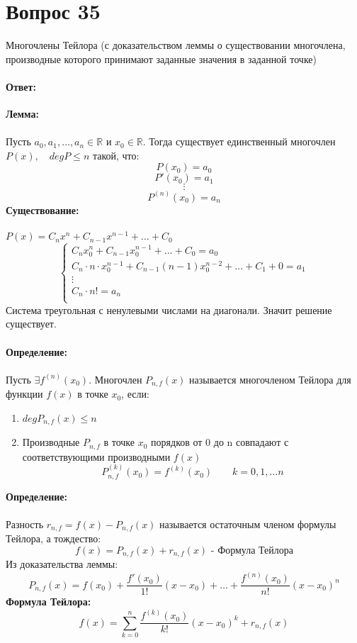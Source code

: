 \documentclass{article}
\DeclareMathOperator{\Exists}{\exists}
\begin{document}
 
\part*{Вопрос 35}
\begin{center}
Многочлены Тейлора (с доказательством леммы о существовании многочлена, производные которого принимают заданные значения в заданной точке)
\end{center}
\subsection*{Ответ:}
\textbf{Лемма:}\\\\
Пусть $a_0, a_1,\ldots,a_n \in \mathbb{R}$ и $x_0\in\mathbb{R}$. Тогда существует единственный многочлен $P(x),\quad deg P\leqslant n$ такой, что:
$$P(x_0)=a_0$$
$$P'(x_0)=a_1$$
$$\vdots$$
$$P^{(n)}(x_0) = a_n$$
\textbf{Существование:}\\\\
$P(x) = C_n x^n+C_{n-1}x^{n-1}+\ldots+C_0$
$$
\begin{cases}
C_n x_0^n+C_{n-1}x_0^{n-1}+\ldots+C_0=a_0\\
C_n\cdot n\cdot x_0^{n-1}+C_{n-1}(n-1)x_0^{n-2}+\ldots+C_1+0=a_1\\
\vdots \\
C_n\cdot n!=a_n\\
\end{cases}
$$
Система треугольная с ненулевыми числами на диагонали. Значит решение существует.\\\\
\textbf{Определение:}\\\\
Пусть $\Exists f^{(n)}(x_0)$. Многочлен $P_{n,f}(x)$ называется многочленом Тейлора для функции $f(x)$ в точке $x_0$, если:
\begin{enumerate}
   \item $deg P_{n,f}(x)\leqslant n$
   \item Производные $P_{n,f}$ в точке $x_0$ порядков от 0 до n совпадают с соответствующими производными $f(x)$
   $$P_{n,f}^{(k)}(x_0)=f^{(k)}(x_0) \qquad k=0,1,\ldots n$$
\end{enumerate}
\textbf{Определение:}\\\\
Разность $r_{n,f}=f(x)-P_{n,f}(x)$ называется остаточным членом формулы Тейлора, а тождество:
$$f(x)=P_{n,f}(x)+r_{n,f}(x)\text{ - Формула Тейлора}$$
Из доказательства леммы:
$$P_{n,f}(x)=f(x_0)+\frac{f'(x_0)}{1!}(x-x_0)+\ldots+\frac{f^{(n)}(x_0)}{n!}(x-x_0)^n$$
\textbf{Формула Тейлора:}
$$f(x)=\sum_{k=0}^n\frac{f^{(k)}(x_0)}{k!}(x-x_0)^k+r_{n,f}(x)$$
 
\end{document}
